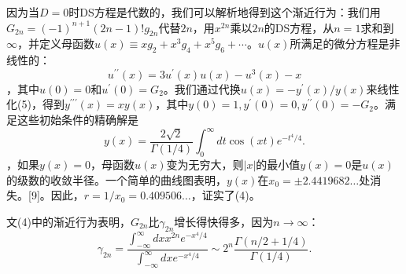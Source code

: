\documentclass[UTF8]{article}
\begin{document}
因为当$D=0$时DS方程是代数的，我们可以解析地得到这个渐近行为：我们用$G_{2 n}=(-1)^{n+1}(2 n-1) ! g_{2 n}$代替$2 n$，用$x^{2 n}$乘以$2 n$的DS方程，从$n=1$求和到$\infty$，并定义母函数$u(x) \equiv x g_2+x^3 g_4+x^5 g_6+\cdots$。$u(x)$所满足的微分方程是非线性的：$$u^{\prime \prime}(x)=3 u^{\prime}(x) u(x)-u^3(x)-x
$$，其中$u(0)=0$和$u^{\prime}(0)=G_2$。我们通过代换$u(x)=-y^{\prime}(x) / y(x)$来线性化(5)，得到$y^{\prime \prime \prime}(x)=x y(x)$，其中$y(0)=1, y^{\prime}(0)=0, y^{\prime \prime}(0)=-G_2$。满足这些初始条件的精确解是$$y(x)=\frac{2 \sqrt{2}}{\Gamma(1 / 4)} \int_0^{\infty} d t \cos (x t) e^{-t^4 / 4} .
$$，如果$y(x)=0$，母函数$u(x)$变为无穷大，则$|x|$的最小值$y(x)=0$是$u(x)$的级数的收敛半径。一个简单的曲线图表明，$y(x)$在$x_0= \pm 2.4419682 \ldots$处消失。[9]。因此，$r=1 / x_0=0.409506 \ldots$，证实了(4)。


文(4)中的渐近行为表明，$G_{2 n}$比$\gamma_{2 n}$增长得快得多，因为$n \rightarrow \infty$：$$
\gamma_{2 n}=\frac{\int_{-\infty}^{\infty} d x x^{2 n} e^{-x^4 / 4}}{\int_{-\infty}^{\infty} d x e^{-x^4 / 4}} \sim 2^n \frac{\Gamma(n / 2+1 / 4)}{\Gamma(1 / 4)} .
$$
\end{document}
